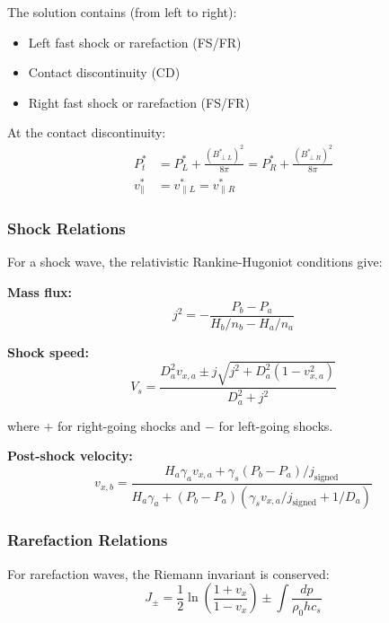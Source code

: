 \documentclass[12pt,a4paper]{article}
\begin{document}
The solution contains (from left to right):
\begin{itemize}
    \item Left fast shock or rarefaction (FS/FR)
    \item Contact discontinuity (CD)
    \item Right fast shock or rarefaction (FS/FR)
\end{itemize}

At the contact discontinuity:
\begin{align}
P_t^* &= P_L^* + \frac{(B_{\perp L}^*)^2}{8\pi} = P_R^* + \frac{(B_{\perp R}^*)^2}{8\pi} \\
v_\parallel^* &= v_{\parallel L}^* = v_{\parallel R}^*
\end{align}

\subsubsection{Shock Relations}

For a shock wave, the relativistic Rankine-Hugoniot conditions give:

\textbf{Mass flux:}
\begin{equation}
j^2 = -\frac{P_b - P_a}{H_b/n_b - H_a/n_a}
\label{eq:mass_flux}
\end{equation}

\textbf{Shock speed:}
\begin{equation}
V_s = \frac{D_a^2 v_{x,a} \pm j\sqrt{j^2 + D_a^2(1-v_{x,a}^2)}}{D_a^2 + j^2}
\label{eq:shock_speed}
\end{equation}

where $+$ for right-going shocks and $-$ for left-going shocks.

\textbf{Post-shock velocity:}
\begin{equation}
v_{x,b} = \frac{H_a \gamma_a v_{x,a} + \gamma_s(P_b - P_a)/j_\text{signed}}
{H_a \gamma_a + (P_b - P_a)(\gamma_s v_{x,a}/j_\text{signed} + 1/D_a)}
\label{eq:post_shock_velocity}
\end{equation}

\subsubsection{Rarefaction Relations}

For rarefaction waves, the Riemann invariant is conserved:
\begin{equation}
J_\pm = \frac{1}{2}\ln\left(\frac{1+v_x}{1-v_x}\right) \pm \int \frac{dp}{\rho_0 h c_s}
\label{eq:riemann_invariant}
\end{equation}
\end{document}
